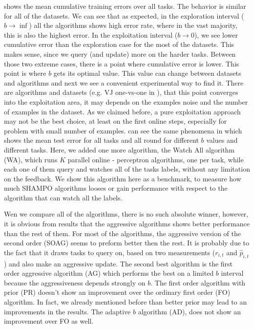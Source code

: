  shows the mean cumulative training errors over all tasks. The behavior is similar for 
all of the datasets. We can see that as expected, in the exploration interval ($b\rightarrow\inf$) 
all the algorithms shows high error rate, where in the vast majority, this is 
also the highest error. In the exploitation interval ($b\rightarrow 0$), we  see 
lower cumulative error than the exploration case for the most of the datasets. 
This makes sense, since we query (and update) more on the harder tasks.
Between those two extreme cases, there is a point where cumulative error is 
lower. This point is where $b$ gets its optimal value. This value can change 
between datasets and algorithms and next we see a convenient experimental way to find it. 
There are algorithms and datasets (e.g. VJ one-vs-one in ), that this point converges
into the exploitation area, it may depends on the examples noise and the number of examples 
in the dataset. As we claimed before, a pure exploitation approach may not be the best choice, at least on 
the first online steps, especially for problem with small number of examples.
can see the same phenomena in  which shows the mean 
test error for all tasks and all round for different $b$ values and different 
tasks. Here, we added one more algorithm, the Watch All algorithm (WA), which runs $K$ parallel online - 
perceptron algorithms, one per task, while each one of them query and watches all of the tasks labels, without any limitation on the feedback.
We show this algorithm here as a benchmark, to measure how much SHAMPO algorithms looses or gain 
performance with respect to the algorithm that can watch all the labels. 

Wen we compare all of the algorithms, there is no such absolute winner, however, 
it is obvious from results that the aggressive algorithms shows better 
performance than the rest of them. For most of the algorithms, the aggressive version of the second order (SOAG) seems to preform better 
then the rest. It is probably due to the fact that it draws tasks to query on, based on two measurements 
($r_{i,t} $ and $\hat{p}_{i,t}$) and also make an aggressive update. The second best algorithm is  
the first order aggressive algorithm (AG) which performs the best on a 
limited $b$ interval because the aggressiveness depends strongly on $b$. The 
first order algorithm with prior (PR) doesn't show an improvement over the ordinary first order (FO) algorithm. 
In fact, we already mentioned before than better prior may lead to an improvements in the results. 
The adaptive $b$ algorithm (AD), does not show an improvement over FO as well. 

